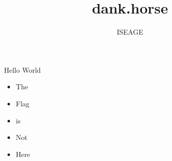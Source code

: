 \documentclass[12pt]{beamer}
\author{ISEAGE}
\title{dank.horse}
\begin{document}
\begin{frame}
\titlepage
\end{frame}


\begin{frame}{Hello World}
\begin{itemize}
\item The
\item Flag
\item is
\item Not
\item Here
\end{itemize}
\end{frame}
\end{document}
